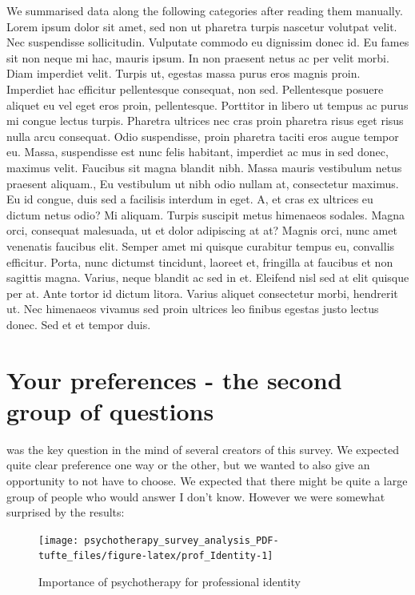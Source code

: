 \documentclass[]{tufte-handout}
\begin{document}
We summarised data along the following categories after reading them
manually. Lorem ipsum dolor sit amet, sed non ut pharetra turpis
nascetur volutpat velit. Nec suspendisse sollicitudin. Vulputate commodo
eu dignissim donec id. Eu fames sit non neque mi hac, mauris ipsum. In
non praesent netus ac per velit morbi. Diam imperdiet velit. Turpis ut,
egestas massa purus eros magnis proin. Imperdiet hac efficitur
pellentesque consequat, non sed. Pellentesque posuere aliquet eu vel
eget eros proin, pellentesque. Porttitor in libero ut tempus ac purus mi
congue lectus turpis. Pharetra ultrices nec cras proin pharetra risus
eget risus nulla arcu consequat. Odio suspendisse, proin pharetra taciti
eros augue tempor eu. Massa, suspendisse est nunc felis habitant,
imperdiet ac mus in sed donec, maximus velit. Faucibus sit magna blandit
nibh. Massa mauris vestibulum netus praesent aliquam., Eu vestibulum ut
nibh odio nullam at, consectetur maximus. Eu id congue, duis sed a
facilisis interdum in eget. A, et cras ex ultrices eu dictum netus odio?
Mi aliquam. Turpis suscipit metus himenaeos sodales. Magna orci,
consequat malesuada, ut et dolor adipiscing at at? Magnis orci, nunc
amet venenatis faucibus elit. Semper amet mi quisque curabitur tempus
eu, convallis efficitur. Porta, nunc dictumst tincidunt, laoreet et,
fringilla at faucibus et non sagittis magna. Varius, neque blandit ac
sed in et. Eleifend nisl sed at elit quisque per at. Ante tortor id
dictum litora. Varius aliquet consectetur morbi, hendrerit ut. Nec
himenaeos vivamus sed proin ultrices leo finibus egestas justo lectus
donec. Sed et et tempor duis.

\section{Your preferences - the second group of
questions}\label{your-preferences---the-second-group-of-questions}

 was the key question in the mind of several creators of
this survey. We expected quite clear preference one way or the other,
but we wanted to also give an opportunity to not have to choose. We
expected that there might be quite a large group of people who would
answer I don't know. However we were somewhat surprised by the results:

\begin{figure}
\texttt{[image: psychotherapy\_survey\_analysis\_PDF-tufte\_files/figure-latex/prof\_Identity-1]} \caption[Importance of psychotherapy for professional identity]{Importance of psychotherapy for professional identity}\label{fig:prof_Identity}
\end{figure}
\end{document}
